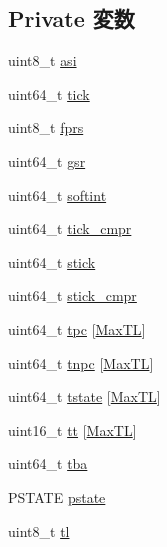 \subsection*{Private 変数}
\begin{DoxyCompactItemize}
\item 
uint8\_\-t \hyperlink{classSparcISA_1_1ISA_a04ffaeb169260b645b1d60977a569820}{asi}
\item 
uint64\_\-t \hyperlink{classSparcISA_1_1ISA_a2c38447b8253c8df855e3131c95941a1}{tick}
\item 
uint8\_\-t \hyperlink{classSparcISA_1_1ISA_a7998e88b27c4979415f261a97674aecf}{fprs}
\item 
uint64\_\-t \hyperlink{classSparcISA_1_1ISA_a0c19cf9f633dff632c426c2c975e8e66}{gsr}
\item 
uint64\_\-t \hyperlink{classSparcISA_1_1ISA_a96081a4d834ffd28272d41775e39b4ef}{softint}
\item 
uint64\_\-t \hyperlink{classSparcISA_1_1ISA_a87a44a4ab3e44b877905a26637748706}{tick\_\-cmpr}
\item 
uint64\_\-t \hyperlink{classSparcISA_1_1ISA_a42a7fb68106d856c2b3e862a7f3de025}{stick}
\item 
uint64\_\-t \hyperlink{classSparcISA_1_1ISA_a674d6e6acef0455ec9a012b42107ff9e}{stick\_\-cmpr}
\item 
uint64\_\-t \hyperlink{classSparcISA_1_1ISA_a9f38b96093eb2fa24e914d41ea4c2ff6}{tpc} \mbox{[}\hyperlink{namespaceSparcISA_a8d6a6b2e04f9b3ebcec03466060ff24a}{MaxTL}\mbox{]}
\item 
uint64\_\-t \hyperlink{classSparcISA_1_1ISA_afed274d04ab4ab24420bbdd8db997d76}{tnpc} \mbox{[}\hyperlink{namespaceSparcISA_a8d6a6b2e04f9b3ebcec03466060ff24a}{MaxTL}\mbox{]}
\item 
uint64\_\-t \hyperlink{classSparcISA_1_1ISA_ab944f4fa2221eb756d169e0d1f1d38d8}{tstate} \mbox{[}\hyperlink{namespaceSparcISA_a8d6a6b2e04f9b3ebcec03466060ff24a}{MaxTL}\mbox{]}
\item 
uint16\_\-t \hyperlink{classSparcISA_1_1ISA_a17e4289d606d8e516baaf88a4fac1440}{tt} \mbox{[}\hyperlink{namespaceSparcISA_a8d6a6b2e04f9b3ebcec03466060ff24a}{MaxTL}\mbox{]}
\item 
uint64\_\-t \hyperlink{classSparcISA_1_1ISA_a43324060a9385bf166885c934a9cd598}{tba}
\item 
PSTATE \hyperlink{classSparcISA_1_1ISA_af3e9d055518924e91c868c1caeabf960}{pstate}
\item 
uint8\_\-t \hyperlink{classSparcISA_1_1ISA_a245b42e6f340c7874989d56608af5cb5}{tl}
\item 

\end{DoxyCompactItemize}

